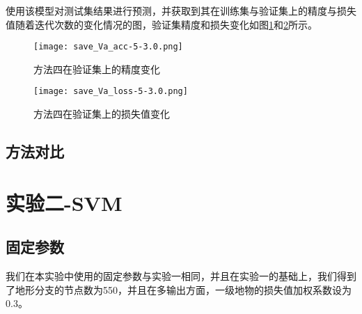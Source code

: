 \documentclass[lang=cn,11pt,a4paper,cite=authoryear]{elegantpaper}
\begin{document}
使用该模型对测试集结果进行预测，并获取到其在训练集与验证集上的精度与损失值随着迭代次数的变化情况的图，验证集精度和损失变化如图\ref{fig:val-acc4}和\ref{fig:val-loss4}所示。

\begin{figure}[!htb]
  \centering
  \texttt{[image: save\_Va\_acc-5-3.0.png]}
  \caption{方法四在验证集上的精度变化}
  \label{fig:val-acc4}
\end{figure}

\begin{figure}[!htb]
  \centering
  \texttt{[image: save\_Va\_loss-5-3.0.png]}
  \caption{方法四在验证集上的损失值变化}
  \label{fig:val-loss4}
\end{figure}


\subsection{方法对比}




\section{实验二-SVM}
\subsection{固定参数}
我们在本实验中使用的固定参数与实验一相同，并且在实验一的基础上，我们得到了地形分支的节点数为550，并且在多输出方面，一级地物的损失值加权系数设为0.3。
\end{document}
